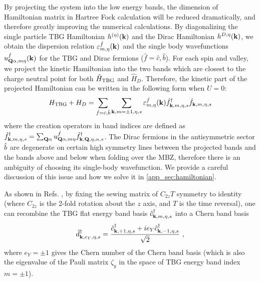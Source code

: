 \documentclass[prb,aps,nofootinbib,amssymb,twocolumn,superscriptaddress,10pt]{revtex4-2}
\begin{document}
By projecting the system into the low energy bands, the dimension of Hamiltonian matrix in Hartree Fock calculation will be reduced dramatically, and therefore greatly improving the numerical calculations. By diagonalizing the single particle TBG Hamiltonian $h^{(\eta)}(\mathbf{k})$ and the Dirac Hamiltonian $h^{D,\eta}(\mathbf{k})$, we obtain the dispersion relation $\varepsilon^{\hat{f}}_{m,\eta}(\mathbf{k})$ and the single body wavefunctions $u_{\mathbf{Q}\alpha, m\eta}^{\hat{f}}(\mathbf{k})$ for the TBG and Dirac fermions ($\hat{f}=\hat{c},\hat{b}$). For each spin and valley, we project the kinetic Hamiltonian into the two bands which are closest to the charge neutral point for both $\hat{H}_{\rm TBG}$ and $\hat{H}_D$. Therefore, the kinetic part of the projected Hamiltonian can be written in the following form when $U=0$:
\begin{equation}
	H_{\rm TBG} + H_D = \sum_{\hat{f} = \hat{c},\hat{b}}\sum_{\mathbf{k}, m=\pm1, \eta, s}\varepsilon_{m, \eta}^{\hat{f}}(\mathbf{k})\hat{f}^\dagger_{\mathbf{k}, m, \eta, s}\hat{f}_{\mathbf{k}, m, \eta, s} 
\end{equation}
where the creation operators in band indices are defined as $\hat{f}^\dagger_{\mathbf{k},m,\eta,s} = \sum_{\mathbf{Q}\alpha}u^{\hat{f}}_{\mathbf{Q}\alpha, m\eta}\hat{f}^\dagger_{\mathbf{k},\mathbf{Q}, \eta, \alpha, s}$. 
The Dirac fermions in the antisymmetric sector $\hat{b}$ are degenerate on certain high symmetry lines between the projected bands and the bands above and below when folding over the MBZ, therefore there is an ambiguity of choosing its single-body wavefunction. 
We provide a careful discussion of this issue and how we solve it in \ref{app_sec:hamiltonian}.

As shown in Refs. \cite{BUL20,HEJ20,BER20a,LIA20}, by fixing the sewing matrix of $C_{2z}T$ symmetry to identity (where $C_{2z}$ is the 2-fold rotation about the $z$ axis, and $T$ is the time reversal), one can recombine the TBG flat energy band basis $\hat{c}^\dagger_{\mathbf{k},m,\eta,s}$ into a Chern band basis
\begin{equation}\label{eq:chernbasis}
\hat{d}^\dagger_{\mathbf{k},e_Y,\eta,s}=\frac{\hat{c}^\dagger_{\mathbf{k},+1,\eta,s}+ie_Y \hat{c}^\dagger_{\mathbf{k},-1,\eta,s}}{\sqrt{2}}\ ,
\end{equation}
where $e_Y=\pm1$ gives the Chern number of the Chern band basis (which is also the eigenvalue of the Pauli matrix $\zeta_y$ in the space of TBG energy band index $m=\pm1$).
\end{document}
